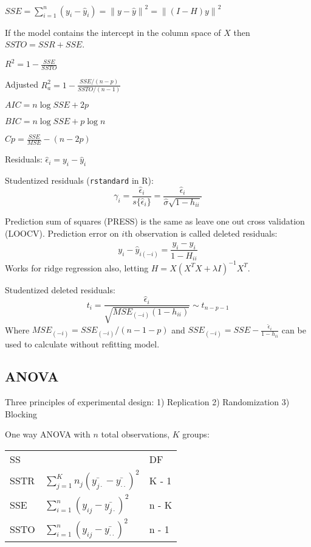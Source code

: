 \documentclass[10pt, twocolumn]{article}
\newcommand{\norm}[1]{\left\lVert#1\right\rVert}
\begin{document}
$SSE = \sum_{i=1}^n (y_i - \hat{y}_i) = \norm{y - \hat{y}}^2
        = \norm{(I - H)y}^2$

If the model contains the intercept in the column space of $X$  then $SSTO = SSR + SSE$.

$R^2 = 1 - \frac{SSE}{SSTO}$

Adjusted $R^2_a = 1 - \frac{SSE / (n-p)}{SSTO / (n-1)}$

$AIC = n \log SSE + 2p$

$BIC = n \log SSE + p \log n$

$Cp = \frac{SSE}{MSE} - (n - 2p)$

Residuals: $\hat{\epsilon}_i = y_i - \hat{y}_i$

Studentized residuals (\texttt{rstandard} in R): 
\[
    \gamma_i =
    \frac{\hat{\epsilon}_i}{ s \{ \hat{\epsilon}_i \} } = 
    \frac{\hat{\epsilon}_i}{\hat{\sigma} \sqrt{1 - h_{ii}}}
\]

Prediction sum of squares (PRESS) is the same as leave one out cross
validation (LOOCV). Prediction error on $i$th observation is called deleted
residuals:
\[
    y_i - \hat{y}_{i (-i)} = \frac{y_i - \hat{y}_i}{1 - H_{ii}}
\]
Works for ridge regression also, letting 
$H = X(X^T X + \lambda I)^{-1} X^T$.

Studentized deleted residuals: 
\[
    t_i = \frac{\hat{\epsilon}_i}{\sqrt{MSE_{(-i)} (1 - h_{ii})}} \sim t_{n - p -1}
\]
Where $MSE_{(-i)} = SSE_{(-i)} / (n - 1 - p)$ and
$SSE_{(-i)} = SSE - \frac{\hat{\epsilon}_i}{1 - h_{ii}}$ can be used to
calculate without refitting model.

\subsection*{ANOVA}

Three principles of experimental design: 1) Replication 2) Randomization 3)
Blocking

One way ANOVA with $n$ total observations, $K$ groups:

{
\centering
\begin{tabular}{lll}
    SS   &  & DF     \\
    SSTR & $\sum_{j=1}^K n_j (\bar{y_{j \cdot}} - \bar{y_{\cdot \cdot}})^2$  & K - 1 \\
    SSE  & $\sum_{i=1}^n (y_{ij} - \bar{y_{j \cdot}})^2$  & n - K \\
    SSTO & $\sum_{i=1}^n (y_{ij} - \bar{y_{\cdot \cdot}})^2$  & n - 1 
\end{tabular}
}
\end{document}
